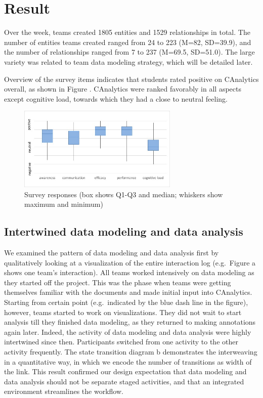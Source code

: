 \section{Result}\label{result}

Over the week, teams created 1805 entities and 1529 relationships in
total. The number of entities teams created ranged from 24 to 223 (M=82,
SD=39.9), and the number of relationships ranged from 7 to 237 (M=69.5,
SD=51.0). The large variety was related to team data modeling strategy,
which will be detailed later.

Overview of the survey items indicates that students rated positive on
CAnalytics overall, as shown in Figure \autocite{fig:survey}. CAnalytics
were ranked favorably in all aspects except cognitive load, towards
which they had a close to neutral feeling.

\begin{figure}
\centering
\includegraphics[width=3.00000in]{./img/survey_boxchart.jpg}
\caption{Survey responses (box shows Q1-Q3 and median; whiskers show
maximum and minimum)\label{fig:survey}}
\end{figure}

\subsection{Intertwined data modeling and data
analysis}\label{intertwined-data-modeling-and-data-analysis}

We examined the pattern of data modeling and data analysis first by
qualitatively looking at a visualization of the entire interaction log
(e.g.~Figure \autocite{fig:intertwined}a shows one team's interaction). All
teams worked intensively on data modeling as they started off the
project. This was the phase when teams were getting themselves familiar
with the documents and made initial input into CAnalytics. Starting from
certain point (e.g.~indicated by the blue dash line in the figure),
however, teams started to work on visualizations. They did not wait to
start analysis till they finished data modeling, as they returned to
making annotations again later. Indeed, the activity of data modeling
and data analysis were highly intertwined since then. Participants
switched from one activity to the other activity frequently. The state
transition diagram \autocite{fig:intertwined}b demonstrates the
interweaving in a quantitative way, in which we encode the number of
transitions as width of the link. This result confirmed our design
expectation that data modeling and data analysis should not be separate
staged activities, and that an integrated environment streamlines the
workflow.

